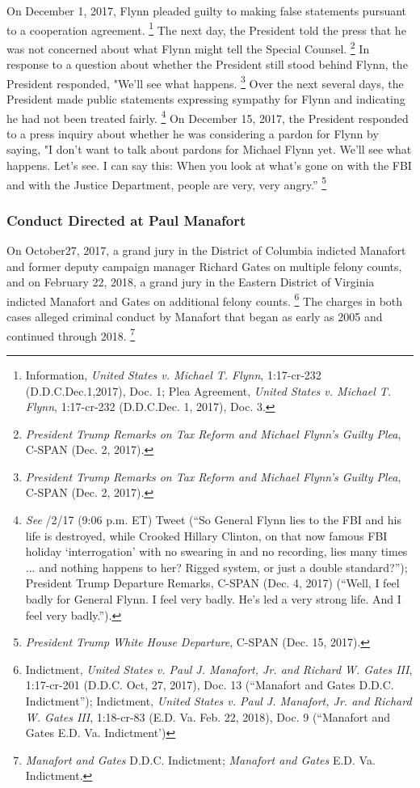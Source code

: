 On December 1, 2017, Flynn pleaded guilty to making false statements pursuant to a cooperation agreement.%
\footnote{Information, \textit{United States v. Michael T. Flynn}, 1:17-cr-232 (D.D.C.Dec.1,2017), Doc. 1;
Plea Agreement, \textit{United States v. Michael T. Flynn}, 1:17-cr-232 (D.D.C.Dec. 1, 2017), Doc. 3.}
The next day, the President told the press that he was not concerned about what Flynn might tell the Special Counsel.%
\footnote{\textit{President Trump Remarks on Tax Reform and Michael Flynn’s Guilty Plea}, C-SPAN (Dec. 2, 2017).}
In response to a question about whether the President still stood behind Flynn, the President responded, "We'll see what happens.%
\footnote{\textit{President Trump Remarks on Tax Reform and Michael Flynn’s Guilty Plea}, C-SPAN (Dec. 2, 2017).}
Over the next several days, the President made public statements expressing sympathy for Flynn and indicating he had not been treated fairly.%
\footnote{\textit{See} /2/17 (9:06 p.m. ET) Tweet (“So General Flynn lies to the FBI and his life is destroyed, while Crooked Hillary Clinton, on that now famous FBI holiday ‘interrogation’ with no swearing in and no recording, lies many times ... and nothing happens to her?
Rigged system, or just a double standard?”);
President Trump Departure Remarks, C-SPAN (Dec. 4, 2017) (“Well, I feel badly for General Flynn.
I feel very badly.
He’s led a very strong life.
And I feel very badly.”).}
On December 15, 2017, the President responded to a press inquiry about whether he was considering a pardon for Flynn by saying, "I don't want to talk about pardons for Michael Flynn yet.
We'll see what happens.
Let's see.
I can say this: When you look at what's gone on with the FBI and with the Justice Department, people are very, very angry.''%
\footnote{\textit{President Trump White House Departure}, C-SPAN (Dec. 15, 2017).}

\subsubsection{Conduct Directed at Paul Manafort}

On October27, 2017, a grand jury in the District of Columbia indicted Manafort and former deputy campaign manager Richard Gates on multiple felony counts, and on February 22, 2018, a grand jury in the Eastern District of Virginia indicted Manafort and Gates on additional felony counts.%
\footnote{Indictment, \textit{United States v. Paul J. Manafort, Jr. and Richard W. Gates III}, 1:17-cr-201 (D.D.C. Oct, 27, 2017), Doc. 13 (“Manafort and Gates D.D.C. Indictment”);
Indictment, \textit{United States v. Paul J. Manafort, Jr. and Richard W. Gates III}, 1:18-cr-83 (E.D. Va. Feb. 22, 2018), Doc. 9 (“Manafort and Gates E.D. Va. Indictment’)}
The charges in both cases alleged criminal conduct by Manafort that began as early as 2005 and continued through 2018.%
\footnote{\textit{Manafort and Gates} D.D.C. Indictment; \textit{Manafort and Gates} E.D. Va. Indictment.}

